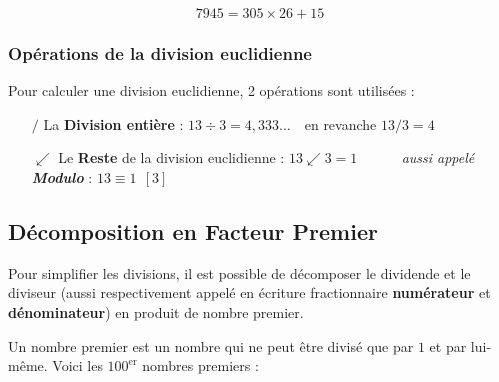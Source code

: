 \documentclass[a4paper]{article}
\begin{document}
\vspace{-6 mm}

{\large $$7945 = 305 \times 26 + 15 $$ }

\vfill

\subsubsection*{Opérations de la division euclidienne}

Pour calculer une division euclidienne, 2 opérations sont utilisées :

	\vspace{2 mm}

	\begin{itemize}
	
	\item[$/$] La \textbf{Division entière} : $13\div3 = 4,333\dots ~~~ $ en revanche $13/3 = 4$
	\item[$\swarrow$] Le \textbf{Reste} de la division euclidienne : $13 \swarrow 3 = 1$ ~~~~~ \textit{aussi appelé \textbf{Modulo}} : $13 \equiv 1 ~~ [3]$
	
	\end{itemize}

\vspace{4 mm}

\pagebreak







\subsection{Décomposition en Facteur Premier}

Pour simplifier les divisions, il est possible de décomposer le dividende et le diviseur (aussi respectivement appelé en écriture fractionnaire \textbf{numérateur} et \textbf{dénominateur}) en produit de nombre premier. 

\vspace{2 mm}


Un nombre premier est un nombre qui ne peut être divisé que par $1$ et par lui-même. Voici les $100^{\text{er}}$ nombres premiers :
\end{document}
